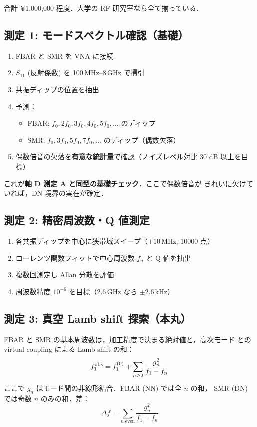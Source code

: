 \documentclass[11pt,a4paper]{article}
\begin{document}
合計 ¥1,000,000 程度．大学の RF 研究室なら全て揃っている．

\subsection{測定 1: モードスペクトル確認（基礎）}

\begin{enumerate}
\item FBAR と SMR を VNA に接続
\item $S_{11}$ (反射係数) を 100\,MHz--8\,GHz で掃引
\item 共振ディップの位置を抽出
\item 予測：
  \begin{itemize}
  \item FBAR: $f_0, 2f_0, 3f_0, 4f_0, 5f_0,\ldots$ のディップ
  \item SMR: $f_0, 3f_0, 5f_0, 7f_0,\ldots$ のディップ（偶数欠落）
  \end{itemize}
\item 偶数倍音の欠落を\textbf{有意な統計量}で確認（ノイズレベル対比
30 dB 以上を目標）
\end{enumerate}

これが\textbf{軸 D 測定 A と同型の基礎チェック}．ここで偶数倍音が
きれいに欠けていれば，DN 境界の実在が確定．

\subsection{測定 2: 精密周波数・Q 値測定}

\begin{enumerate}
\item 各共振ディップを中心に狭帯域スイープ（$\pm 10$\,MHz, 10000 点）
\item ローレンツ関数フィットで中心周波数 $f_n$ と Q 値を抽出
\item 複数回測定し Allan 分散を評価
\item 周波数精度 $10^{-6}$ を目標（2.6\,GHz なら $\pm 2.6$\,kHz）
\end{enumerate}

\subsection{測定 3: 真空 Lamb shift 探索（本丸）}

FBAR と SMR の基本周波数は，加工精度で決まる絶対値と，高次モード
との virtual coupling による Lamb shift の和：
\begin{equation}
  f_1^{\rm obs} = f_1^{(0)} + \sum_{n\geq 2} \frac{g_n^2}{f_1 - f_n}
\end{equation}
ここで $g_n$ はモード間の非線形結合．FBAR (NN) では全 $n$ の和，
SMR (DN) では奇数 $n$ のみの和．差：
\begin{equation}
  \Delta f = \sum_{n\;\text{even}} \frac{g_n^2}{f_1 - f_n}
\end{equation}
\end{document}
